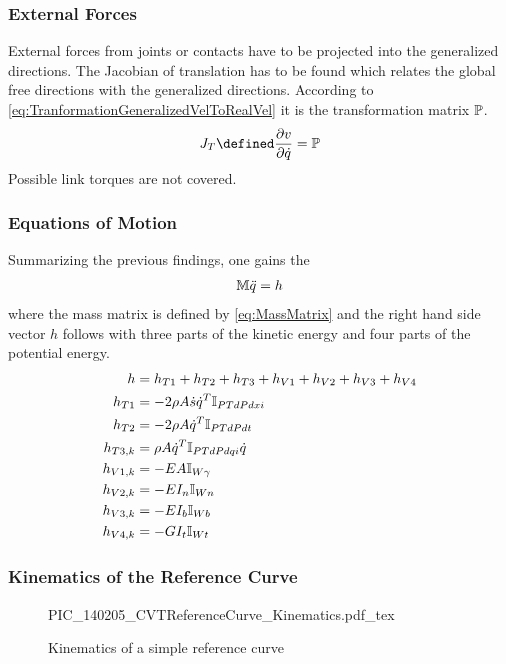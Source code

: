 \subsubsection{External Forces}

External forces from joints or contacts have to be projected into the generalized directions.
The Jacobian of translation has to be found which relates the global free directions with the generalized directions.
According to \eqref{eq:TranformationGeneralizedVelToRealVel} it is the transformation matrix $\mathbb{P}$.
%
\begin{align*}
  J_T \defined \pd{v}{\dotq} = \msP
\end{align*}
%
Possible link torques are not covered.

\subsubsection{Equations of Motion}

Summarizing the previous findings, one gains the \EOMs
%
\begin{align}
  \mathbb{M} \ddot{q} = h
\end{align}
%
where the mass matrix is defined by \eqref{eq:MassMatrix} and the right hand side vector $h$ follows with three parts of the kinetic energy and four parts of the potential energy.
%
\begin{subequations}
\begin{align}
  h &= h _{T1} + h _{T2} + h _{T3} + h _{V1} + h _{V2} + h _{V3} + h _{V4}\\
  h _{T1} &= - 2 \rho A \dot{s} \dot{q}^T \mathbb{I} _{PTdPdxi}\\
  h _{T2} &= - 2 \rho A \dot{q}^T \mathbb{I} _{PTdPdt}\\
  h _{T3,k} &= \rho A \dot{q}^T \mathbb{I} _{PTdPdqi} \dot{q}\\
  h _{V1,k} &= - E A \mathbb{I} _{W\gamma} \\
  h _{V2,k} &= - E I_n \mathbb{I} _{Wn} \\
  h _{V3,k} &= - E I_b \mathbb{I} _{Wb} \\
  h _{V4,k} &= - G I_t \mathbb{I} _{Wt}
\end{align}
\end{subequations}
%
\subsubsection{Kinematics of the Reference Curve}

\begin{figure}
  \begin{center}
    {PIC_140205_CVTReferenceCurve_Kinematics.pdf_tex}
    \caption{Kinematics of a simple reference curve}
    \label{fig:PIC_140205_CVTReferenceCurve_Kinematics}
  \end{center}
\end{figure}

